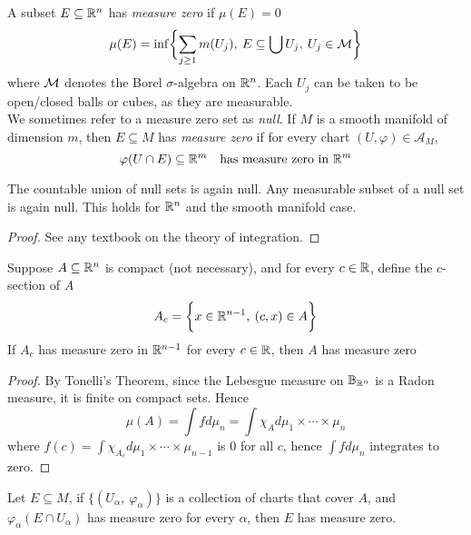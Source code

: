 \documentclass[../main-manifolds.tex]{subfiles}
\begin{document}
\begin{definition}\label{lee-measure-zero}
    A subset $E\subseteq{\mathbb{R}^n}$ has \emph{measure zero} if $\mu(E)=0$
    \[
        \mu(E) = \inf\biggl\{{\sum_{j\geq 1} m(U_j),\: E\subseteq \bigcup U_j,\: U_j\in\mathcal{M}}\biggr\}
    \]
    where $\mathcal{M}$ denotes the Borel $\sigma$-algebra on ${\mathbb{R}^n}$. Each $U_j$ can be taken to be open/closed balls or cubes, as they are measurable.\\

    We sometimes refer to a measure zero set as \emph{null}. If $M$ is a smooth manifold of dimension $m$, then $E\subseteq M$ has \emph{measure zero} if for every chart $(U,\varphi)\in\mathcal{A}_M$, 
    \[
        \varphi(U\cap E)\subseteq{\mathbb{R}^m}\quad\text{has measure zero in }{\mathbb{R}^m}
    \]
\end{definition}
\begin{wts}\label{lee-sards-subadditivity}
    The countable union of null sets is again null. Any measurable subset of a null set is again null. This holds for ${\mathbb{R}^n}$ and the smooth manifold case.
\end{wts}
\begin{proof}
    See any textbook on the theory of integration.
\end{proof}
\begin{wts}\label{lee-theorem6.2}
    Suppose $A\subseteq{\mathbb{R}^n}$ is compact (not necessary), and for every $c\in \mathbb{R}$, define the $c$-section of $A$
    \[
        A_c = \biggl\{{x\in\mathbb{R}^{n-1},\: (c,x)\in A}\biggr\}
    \]
    If $A_c$ has measure zero in $\mathbb{R}^{n-1}$ for every $c\in\mathbb{R}$, then $A$ has measure zero
\end{wts}
\begin{proof}
    By Tonelli's Theorem, since the Lebesgue measure on ${\mathbb{B}}_{\mathbb{R}^n}$ is a Radon measure, it is finite on compact sets. Hence
    \[
        \mu(A)=\int fd\mu_n = \int \chi_{A}d\mu_1\times\cdots\times\mu_n
    \]
    where $f(c) = \int \chi_{A_c}d\mu_1\times\cdots\times\mu_{n-1}$ is $0$ for all $c$, hence $\int fd\mu_n$ integrates to zero.
\end{proof}
\begin{wts}\label{lee-theorem6.6}
    Let $E\subseteq M$, if $\{(U_\alpha,\: \varphi_\alpha)\}$ is a collection of charts that cover $A$, and $\varphi_\alpha(E\cap U_\alpha)$ has measure zero for every $\alpha$, then $E$ has measure zero.
\end{wts}
\end{document}
